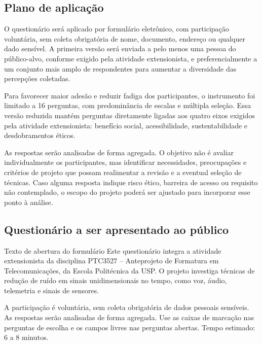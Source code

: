 \subsection{Plano de aplicação}

O questionário será aplicado por formulário eletrônico, com participação voluntária, sem coleta obrigatória de nome, documento, endereço ou qualquer dado sensível. A primeira versão será enviada a pelo menos uma pessoa do público-alvo, conforme exigido pela atividade extensionista, e preferencialmente a um conjunto mais amplo de respondentes para aumentar a diversidade das percepções coletadas.

Para favorecer maior adesão e reduzir fadiga dos participantes, o instrumento foi limitado a 16 perguntas, com predominância de escalas e múltipla seleção. Essa versão reduzida mantém perguntas diretamente ligadas aos quatro eixos exigidos pela atividade extensionista: benefício social, acessibilidade, sustentabilidade e desdobramentos éticos.

As respostas serão analisadas de forma agregada. O objetivo não é avaliar individualmente os participantes, mas identificar necessidades, preocupações e critérios de projeto que possam realimentar a revisão e a eventual seleção de técnicas. Caso alguma resposta indique risco ético, barreira de acesso ou requisito não contemplado, o escopo do projeto poderá ser ajustado para incorporar esse ponto à análise.

\newpage

\subsection{Questionário a ser apresentado ao público}

\setcounter{pergunta}{0}

\begin{blocoFormulario}{Texto de abertura do formulário}
\small
Este questionário integra a atividade extensionista da disciplina PTC3527 -- Anteprojeto de Formatura em Telecomunicações, da Escola Politécnica da USP. O projeto investiga técnicas de redução de ruído em sinais unidimensionais no tempo, como voz, áudio, telemetria e sinais de sensores.

A participação é voluntária, sem coleta obrigatória de dados pessoais sensíveis. As respostas serão analisadas de forma agregada. Use as caixas de marcação nas perguntas de escolha e os campos livres nas perguntas abertas. Tempo estimado: 6 a 8 minutos.
\end{blocoFormulario}


